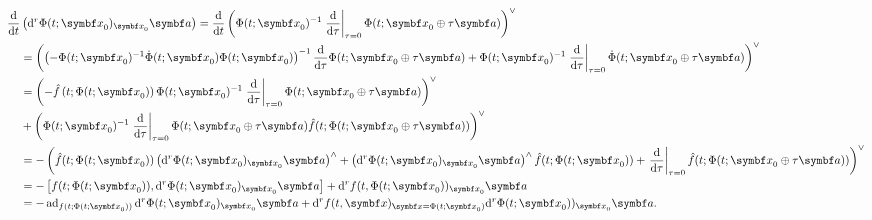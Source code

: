 \begin{equation*}
  \begin{aligned}
    \frac{\mathrm{d}}{\mathrm{d}t}
     & \left( \mathrm{d}^r \Phi(t; \x_0)_{\x_0} \a \right)
    = \frac{\mathrm{d}}{\mathrm{d}t} \left( \Phi(t; \x_{0})^{-1} \left. \frac{\mathrm{d}}{\mathrm{d} \tau} \right|_{\tau = 0} \Phi(t; \x_{0} \oplus \tau \a) \right)^{\vee}                                                                                                                                                                                                                                                                                      \\
     & = \left( \left( -\Phi(t; \x_{0})^{-1} \dot \Phi(t; \x_{0}) \Phi(t; \x_{0}) \right)^{-1} \frac{\mathrm{d}}{\mathrm{d}\tau} \Phi(t; \x_{0} \oplus \tau \a) +  \Phi(t; \x_{0})^{-1} \left. \frac{\mathrm{d}}{\mathrm{d}\tau} \right|_{\tau=0} \dot \Phi(t; \x_{0} \oplus \tau \a) \right)^{\vee}                                                                                                                                                             \\
     & = \left( -\hat f\left(t; \Phi(t; \x_{0})\right) \Phi(t; \x_{0})^{-1} \left. \frac{\mathrm{d}}{\mathrm{d}\tau} \right|_{\tau = 0} \Phi(t; \x_{0} \oplus \tau \a) \right)^\vee  \\ 
     & + \left( \Phi(t; \x_{0})^{-1} \left. \frac{\mathrm{d}}{\mathrm{d}\tau} \right|_{\tau = 0} \Phi(t; \x_{0} \oplus \tau \a) \hat f(t; \Phi(t; \x_{0} \oplus \tau \a)) \right)^{\vee} \\
     & = - \left( \hat f(t; \Phi(t; \x_{0})) \left( \mathrm{d}^{r} \Phi(t; \x_{0})_{\x_{0}} \a \right)^{\wedge}
    + \left( \mathrm{d}^{r} \Phi(t; \x_{0})_{\x_{0}} \a \right)^{\wedge} \hat f(t; \Phi(t; \x_{0}))  + \left. \frac{\mathrm{d}}{\mathrm{d}\tau} \right|_{\tau = 0} \hat f(t; \Phi(t; \x_{0} \oplus \tau \a)) \right)^{\vee}                                                                                                                                                                                                                                      \\
     & = -\left[  f(t; \Phi(t; \x_{0})), \mathrm{d}^{r} \Phi(t; \x_{0})_{\x_{0}} \a\right] + \mathrm{d}^{r} f(t, \Phi(t; \x_{0}))_{\x_{0}} \a                                                                                                                                                                                                                                                                                                                    \\
     & = -\ad_{f(t; \Phi(t; \x_{0}))} \mathrm{d}^{r} \Phi(t; \x_{0})_{\x_{0}} \a + \mathrm{d}^{r} f(t, \x)_{\x = \Phi(t; \x_{0})} \mathrm{d}^{r} \Phi(t; \x_{0}))_{\x_{0}} \a.
  \end{aligned}
\end{equation*}
